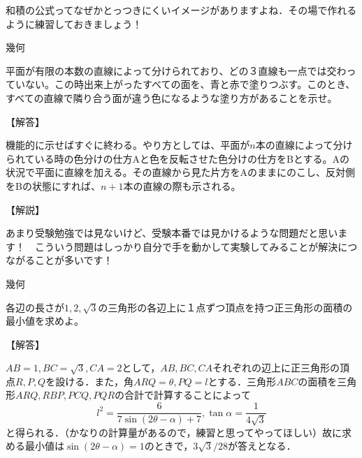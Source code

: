 \documentclass[a4paper,fleqn,dvipdfmx]{jsarticle}
\begin{document}
    和積の公式ってなぜかとっつきにくいイメージがありますよね．その場で作れるように練習しておきましょう！



\newpage


\begin{itembox}[l]{幾何}

    平面が有限の本数の直線によって分けられており、どの３直線も一点では交わっていない。この時出来上がったすべての面を、青と赤で塗りつぶす。このとき、すべての直線で隣り合う面が違う色になるような塗り方があることを示せ。
    
\end{itembox}


\begin{flushleft}
【解答】
\end{flushleft}

    機能的に示せばすぐに終わる。やり方としては、平面が$n$本の直線によって分けられている時の色分けの仕方Aと色を反転させた色分けの仕方をBとする。Aの状況で平面に直線を加える。その直線から見た片方をAのままにのこし、反対側をBの状態にすれば、$n+1$本の直線の際も示される。

\begin{flushleft}
【解説】
\end{flushleft}

    あまり受験勉強では見ないけど、受験本番では見かけるような問題だと思います！　こういう問題はしっかり自分で手を動かして実験してみることが解決につながることが多いです！



\newpage


\begin{itembox}[l]{幾何}

    各辺の長さが$1,2,\sqrt{3}$の三角形の各辺上に１点ずつ頂点を持つ正三角形の面積の最小値を求めよ。
    
\end{itembox}


\begin{flushleft}
【解答】
\end{flushleft}

    $AB=1,BC=\sqrt{3},CA=2$として，$AB,BC,CA$それぞれの辺上に正三角形の頂点$R,P,Q$を設ける．また，角$ARQ=\theta,PQ=l$とする．三角形$ABC$の面積を三角形$ARQ,RBP,PCQ,PQR$の合計で計算することによって
    $$l^2=\frac{6}{7\sin(2\theta - \alpha)+7},\tan \alpha = \frac{1}{4\sqrt{3}}$$
    と得られる．（かなりの計算量があるので，練習と思ってやってほしい）故に求める最小値は$\sin(2\theta - \alpha)=1$のときで，$3\sqrt{3}/28$が答えとなる．
\end{document}
